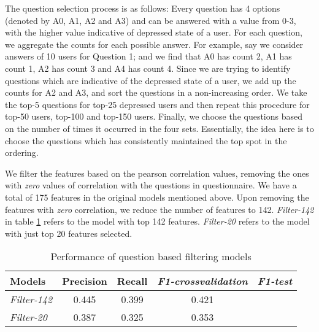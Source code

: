 The question selection process is as follows: Every question has 4 options (denoted by A0, A1, A2 and A3) and can be answered with a value from 0-3, with the higher value indicative of depressed state of a user. For each question, we aggregate the counts for each possible answer. For example, say we consider answers of 10 users for Question 1; and we find that A0 has count 2, A1 has count 1, A2 has count 3 and A4 has count 4. Since we are trying to identify questions which are indicative of the depressed state of a user, we add up the counts for A2 and A3, and sort the questions in a non-increasing order. We take the top-5 questions for top-25 depressed users and then repeat this procedure for top-50 users, top-100 and top-150 users. Finally, we choose the questions based on the number of times it occurred in the four sets. Essentially, the idea here is to choose the questions which has consistently maintained the top spot in the ordering.

We filter the features based on the pearson correlation values, removing the ones with \textit{zero} values of correlation with the questions in questionnaire. We have a total of 175 features in the original models mentioned above. Upon removing the features with \textit{zero} correlation, we reduce the number of features to 142. \textit{Filter-142} in table \ref{table:results_3} refers to the model with top 142 features. \textit{Filter-20} refers to the model with just top 20 features selected.


\begin{table} [ht]
\begin{tabular}{lcccc}
\toprule
Models & Precision & Recall & \textit{F1-crossvalidation} & \textit{F1-test}  \\
\midrule
\textit{Filter-142} & 0.445 & 0.399 & 0.421 &  \\
\textit{Filter-20} & 0.387 & 0.325 & 0.353 &  \\
\bottomrule
\end{tabular}
\caption{Performance of question based filtering models}
\label{table:results_3}
\end{table}








